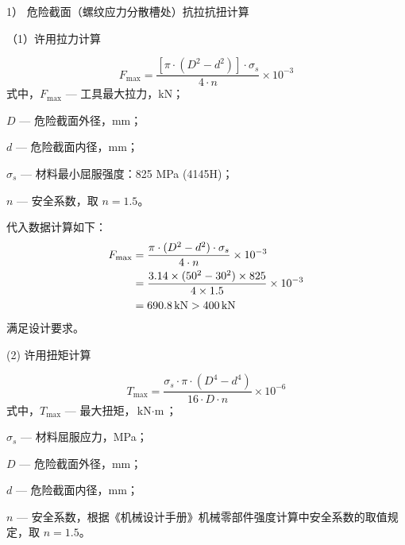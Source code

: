 1） 危险截面（螺纹应力分散槽处）抗拉抗扭计算

（1）许用拉力计算

\begin{equation}
    F_{\max} = \frac{[\pi \cdot (D^2 - d^2)] \cdot \sigma_s}{4 \cdot n} \times 10^{-3}
\end{equation}
式中，$F_{\max}$ — 工具最大拉力，kN；

$D$ — 危险截面外径，mm；

$d$ — 危险截面内径，mm；

$\sigma_s$ — 材料最小屈服强度：825 MPa (4145H)；

$n$ — 安全系数，取 $n = 1.5$。

代入数据计算如下：
\begin{equation}
\centering
\begin{aligned}
    F_{\max} &= \frac{\pi \cdot (D^2 - d^2) \cdot \sigma_s}{4 \cdot n} \times 10^{-3} \\
             &= \frac{3.14 \times (50^2 - 30^2) \times 825}{4 \times 1.5} \times 10^{-3} \\
             &= 690.8 \, \text{kN} > 400 \, \text{kN}
\end{aligned}
\end{equation}
满足设计要求。

(2) 许用扭矩计算

\begin{equation}
    T_{\max} = \frac{\sigma_s \cdot \pi \cdot (D^4 - d^4)}{16 \cdot D \cdot n} \times 10^{-6}
\end{equation}
式中，$T_{\max}$ — 最大扭矩，$\text{kN} \cdot \text{m}$；

$\sigma_s$ — 材料屈服应力，MPa；

$D$ — 危险截面外径，mm；

$d$ — 危险截面内径，mm；

$n$ — 安全系数，根据《机械设计手册》机械零部件强度计算中安全系数的取值规定\cite{ref26}，取 $n = 1.5$。

